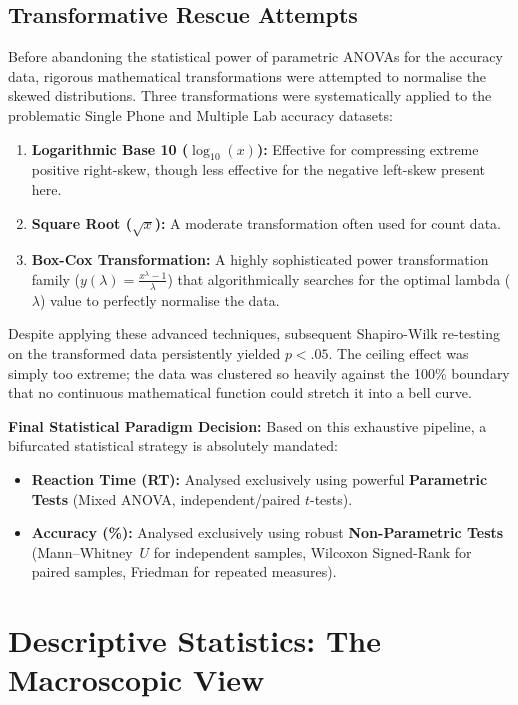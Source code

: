 \documentclass[11pt,a4paper]{article}
\begin{document}
\subsection{Transformative Rescue Attempts}
Before abandoning the statistical power of parametric ANOVAs for the accuracy data, rigorous mathematical transformations were attempted to normalise the skewed distributions. Three transformations were systematically applied to the problematic Single Phone and Multiple Lab accuracy datasets:
\begin{enumerate}
    \item \textbf{Logarithmic Base 10 ($\log_{10}(x)$):} Effective for compressing extreme positive right-skew, though less effective for the negative left-skew present here.
    \item \textbf{Square Root ($\sqrt{x}$):} A moderate transformation often used for count data.
    \item \textbf{Box-Cox Transformation:} A highly sophisticated power transformation family ($y(\lambda) = \frac{x^\lambda - 1}{\lambda}$) that algorithmically searches for the optimal lambda ($\lambda$) value to perfectly normalise the data.
\end{enumerate}

Despite applying these advanced techniques, subsequent Shapiro-Wilk re-testing on the transformed data persistently yielded $p < .05$. The ceiling effect was simply too extreme; the data was clustered so heavily against the 100\% boundary that no continuous mathematical function could stretch it into a bell curve.

\textbf{Final Statistical Paradigm Decision:} 
Based on this exhaustive pipeline, a bifurcated statistical strategy is absolutely mandated:
\begin{itemize}
    \item \textbf{Reaction Time (RT):} Analysed exclusively using powerful \textbf{Parametric Tests} (Mixed ANOVA, independent/paired $t$-tests).
    \item \textbf{Accuracy (\%):} Analysed exclusively using robust \textbf{Non-Parametric Tests} (Mann--Whitney~$U$ for independent samples, Wilcoxon Signed-Rank for paired samples, Friedman for repeated measures).
\end{itemize}

\section{Descriptive Statistics: The Macroscopic View}
\label{sec:descriptive}
\end{document}
